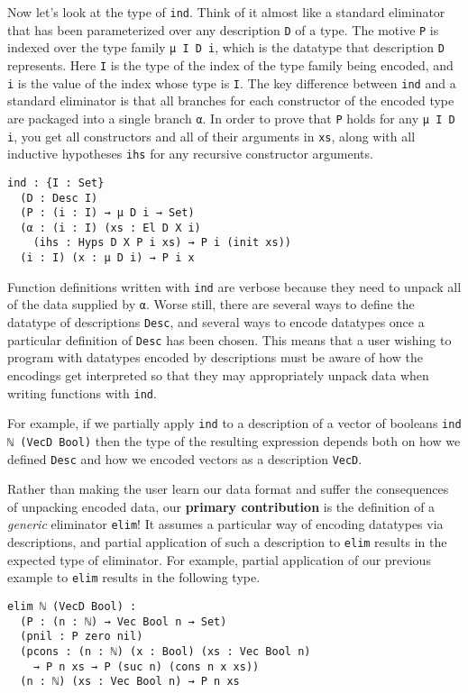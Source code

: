 \documentclass[preprint,nonatbib]{sigplanconf}
\begin{document}
Now let's look at the type of {\tt ind}. Think of it almost like a standard
eliminator that has been parameterized over any description {\tt D} of a type. The
motive {\tt P} is indexed over the type family {\tt μ I D i}, which is
the datatype that description {\tt D} represents.
Here {\tt I} is the type of the index of the type family being
encoded, and {\tt i} is the value of the index whose type is {\tt I}.
The key difference
between {\tt ind} and a standard eliminator is that all branches for
each constructor of the encoded type are packaged into a single branch
{\tt α}. In order to prove that {\tt P} holds for any
{\tt μ I D i}, you get all constructors and all of their
arguments in {\tt xs}, along with all inductive
hypotheses {\tt ihs} for any recursive constructor arguments.

\newpage

\begin{verbatim}
ind : {I : Set}
  (D : Desc I)
  (P : (i : I) → μ D i → Set)
  (α : (i : I) (xs : El D X i)
    (ihs : Hyps D X P i xs) → P i (init xs))
  (i : I) (x : μ D i) → P i x
\end{verbatim}

Function definitions written with {\tt ind} are verbose
because they need to unpack all of the data supplied by {\tt α}.
Worse still, there are several ways to define the datatype of
descriptions {\tt Desc}, and several ways to encode datatypes once a
particular definition of {\tt Desc} has been chosen. This means that a
user wishing to program with datatypes encoded by descriptions must be
aware of how the encodings get interpreted so that they may
appropriately unpack data when writing functions with {\tt ind}.

For example, if we partially apply {\tt ind} to a description of a
vector of booleans {\tt ind ℕ (VecD Bool)} then the type of the
resulting expression depends both on how we defined {\tt Desc} and how
we encoded vectors as a description {\tt VecD}.

Rather than making the user learn our data format and suffer the
consequences of unpacking encoded data, our {\bf primary contribution} is
the definition of a {\it generic} eliminator {\tt elim}!
It assumes a particular way of encoding
datatypes via descriptions, and partial application of such a
description to {\tt elim} results in the expected type of eliminator.
For example, partial application of our previous example to
{\tt elim} results in the following type.

\begin{verbatim}
elim ℕ (VecD Bool) :
  (P : (n : ℕ) → Vec Bool n → Set)
  (pnil : P zero nil)
  (pcons : (n : ℕ) (x : Bool) (xs : Vec Bool n)
    → P n xs → P (suc n) (cons n x xs))
  (n : ℕ) (xs : Vec Bool n) → P n xs
\end{verbatim}
\end{document}
